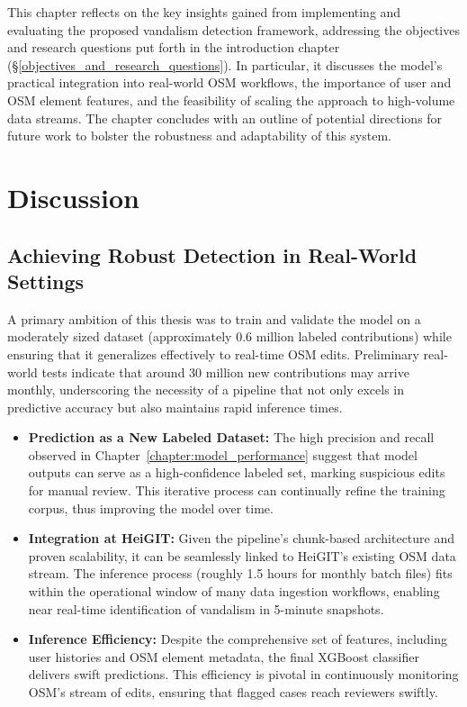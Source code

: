 \documentclass[
    13pt, %
    a4paper, %
    listof=totoc, %
    bibliography=totoc, %
    index=totoc, %
    headsepline
]{scrreprt}
\begin{document}
This chapter reflects on the key insights gained from implementing and evaluating the proposed vandalism detection framework, addressing the objectives and research questions put forth in the introduction chapter (\S\ref{objectives_and_research_questions}). In particular, it discusses the model’s practical integration into real-world OSM workflows, the importance of user and OSM element features, and the feasibility of scaling the approach to high-volume data streams. The chapter concludes with an outline of potential directions for future work to bolster the robustness and adaptability of this system.

\section{Discussion}
\label{sec:discussion}

\subsection{Achieving Robust Detection in Real-World Settings}
A primary ambition of this thesis was to train and validate the model on a moderately sized dataset (approximately 0.6 million labeled contributions) while ensuring that it generalizes effectively to real-time OSM edits. Preliminary real-world tests indicate that around 30 million new contributions may arrive monthly, underscoring the necessity of a pipeline that not only excels in predictive accuracy but also maintains rapid inference times. 
\begin{itemize}
    \item \textbf{Prediction as a New Labeled Dataset:} The high precision and recall observed in Chapter~\ref{chapter:model_performance} suggest that model outputs can serve as a high-confidence labeled set, marking suspicious edits for manual review. This iterative process can continually refine the training corpus, thus improving the model over time.
    \item \textbf{Integration at HeiGIT:} Given the pipeline’s chunk-based architecture and proven scalability, it can be seamlessly linked to HeiGIT’s existing OSM data stream. The inference process (roughly 1.5 hours for monthly batch files) fits within the operational window of many data ingestion workflows, enabling near real-time identification of vandalism in 5-minute snapshots.
    \item \textbf{Inference Efficiency:} Despite the comprehensive set of features, including user histories and OSM element metadata, the final XGBoost classifier delivers swift predictions. This efficiency is pivotal in continuously monitoring OSM’s stream of edits, ensuring that flagged cases reach reviewers swiftly.
\end{itemize}
\end{document}

